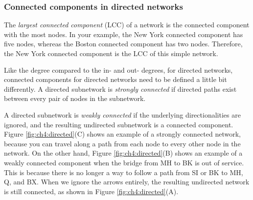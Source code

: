 \subsubsection{Connected components in directed networks}

The \textit{largest connected component} (LCC) of a network is the connected component with the most nodes. In your example, the New York connected component has five nodes, whereas the Boston connected component has two nodes. Therefore, the New York connected component is the LCC of this simple network.

Like the degree compared to the in- and out- degrees, for directed networks, connected components for directed networks need to be defined a little bit differently. A directed subnetwork is \textit{strongly connected} if directed paths exist between every pair of nodes in the subnetwork. 

A directed subnetwork is \textit{weakly connected} if the underlying directionalities are ignored, and the resulting undirected subnetwork is a connected component. Figure \ref{fig:ch4:directed}(C) shows an example of a strongly connected network, because you can travel along a path from each node to every other node in the network. On the other hand, Figure \ref{fig:ch4:directed}(B) shows an example of a weakly connected component when the bridge from MH to BK is out of service. This is because there is no longer a way to follow a path from SI or BK to MH, Q, and BX. When we ignore the arrows entirely, the resulting undirected network is still connected, as shown in Figure \ref{fig:ch4:directed}(A).


\newpage